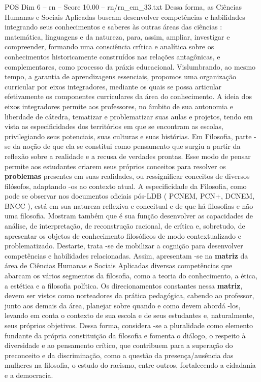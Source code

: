 \begin{textsample}{POS Dim 6 – rn – Score 10.00 – rn/rn\_em\_33.txt}
Dessa forma, as Ciências Humanas e Sociais Aplicadas buscam desenvolver competências e habilidades integrando seus conhecimentos e saberes às outras áreas das ciências : matemática, linguagens e da natureza, para, assim, ampliar, investigar e compreender, formando uma consciência crítica e analítica sobre os conhecimentos historicamente construídos nas relações antagônicas, e complementares, como processo da práxis educacional.
Vislumbrando, ao mesmo tempo, a garantia de aprendizagens essenciais, propomos uma organização curricular por eixos integradores, mediante os quais se possa articular efetivamente os componentes curriculares da área do conhecimento.
A ideia dos eixos integradores permite aos professores, no âmbito de sua autonomia e liberdade de cátedra, tematizar e problematizar suas aulas e projetos, tendo em vista as especificidades dos territórios em que se encontram as escolas, privilegiando seus potenciais, suas culturas e suas histórias.
Em Filosofia, parte -se da noção de que ela se constitui como pensamento que surgiu a partir da reflexão sobre a realidade e a recusa de verdades prontas.
Esse modo de pensar permite aos estudantes criarem seus próprios conceitos para resolver os \textbf{problemas} presentes em suas realidades, ou ressignificar conceitos de diversos filósofos, adaptando -os ao contexto atual.
A especificidade da Filosofia, como pode se observar nos documentos oficiais pós-LDB ( PCNEM, PCN+, DCNEM, BNCC ), está em sua natureza reflexiva e conceitual e de que há filosofias e não uma filosofia.
Mostram também que é sua função desenvolver as capacidades de análise, de interpretação, de reconstrução racional, de crítica e, sobretudo, de apresentar os objetos de conhecimento filosóficos de modo contextualizado e problematizado.
Destarte, trata -se de mobilizar a cognição para desenvolver competências e habilidades relacionadas.
Assim, apresentam -se na \textbf{matriz} da área de Ciências Humanas e Sociais Aplicadas diversas competências que abarcam os vários segmentos da filosofia, como a teoria do conhecimento, a ética, a estética e a filosofia política.
Os direcionamentos constantes nessa \textbf{matriz}, devem ser vistos como norteadores da prática pedagógica, cabendo ao professor, junto aos demais da área, planejar sobre quando e como devem abordá -los, levando em conta o contexto de sua escola e de seus estudantes e, naturalmente, seus próprios objetivos.
Dessa forma, considera -se a pluralidade como elemento fundante da própria constituição da filosofia e fomenta o diálogo, o respeito à diversidade e ao pensamento crítico, que contribuem para a superação do preconceito e da discriminação, como a questão da presença/ausência das mulheres na filosofia, o estudo do racismo, entre outros, fortalecendo a cidadania e a democracia.

\end{textsample}
